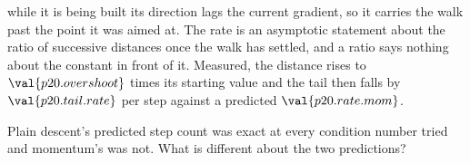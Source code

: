 \begin{furtherproblems}
{  while it is being built its direction lags the current gradient, so it
  carries the walk past the point it was aimed at. The rate is an asymptotic
  statement about the ratio of successive distances once the walk has settled,
  and a ratio says nothing about the constant in front of it. Measured, the
  distance rises to $\val{p20.overshoot}$ times its starting value and the
  tail then falls by $\val{p20.tail.rate}$ per step against a predicted
  $\val{p20.rate.mom}$.}
\item Plain descent's predicted step count was exact at every condition
  number tried and momentum's was not. What is different about the two
  predictions?
\end{furtherproblems}
